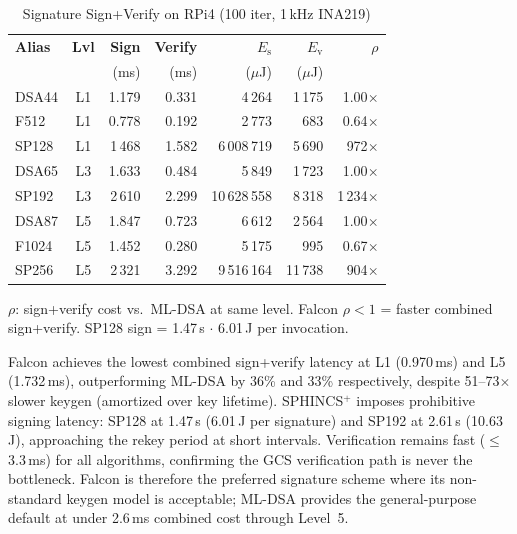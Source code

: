 \begin{table}[t]
\centering
\caption{Signature Sign+Verify on RPi4 (100 iter, 1\,kHz INA219)}
\label{tab:sig}
\footnotesize
\begin{tabular}{@{}lcrrrrr@{}}
\toprule
\textbf{Alias} & \textbf{Lvl} &
  \textbf{Sign} & \textbf{Verify} &
  \textbf{$E_\text{s}$} & \textbf{$E_\text{v}$} &
  \textbf{$\rho$} \\
& & (ms) & (ms) & ($\mu$J) & ($\mu$J) & \\
\midrule
DSA44  & L1 & 1.179 & 0.331  & 4\,264  & 1\,175  & 1.00$\times$ \\
F512   & L1 & 0.778 & 0.192  & 2\,773  & 683     & 0.64$\times$ \\
SP128  & L1 & 1\,468 & 1.582  & 6\,008\,719 & 5\,690 & 972$\times$ \\
\midrule
DSA65  & L3 & 1.633 & 0.484  & 5\,849  & 1\,723  & 1.00$\times$ \\
SP192  & L3 & 2\,610 & 2.299  & 10\,628\,558 & 8\,318 & 1\,234$\times$ \\
\midrule
DSA87  & L5 & 1.847 & 0.723  & 6\,612  & 2\,564  & 1.00$\times$ \\
F1024  & L5 & 1.452 & 0.280  & 5\,175  & 995     & 0.67$\times$ \\
SP256  & L5 & 2\,321 & 3.292  & 9\,516\,164 & 11\,738 & 904$\times$ \\
\bottomrule
\end{tabular}
\begin{tablenotes}
\footnotesize
\item $\rho$: sign+verify cost vs.\ ML-DSA at same level.
  Falcon $\rho < 1$ = faster combined sign+verify.
  SP128 sign = 1.47\,s $\cdot$ 6.01\,J per invocation.
\end{tablenotes}
\end{table}

Falcon achieves the lowest combined sign+verify latency at L1
(0.970\,ms) and L5 (1.732\,ms), outperforming ML-DSA by 36\% and 33\%
respectively, despite 51--73$\times$ slower keygen (amortized over key
lifetime).  SPHINCS$^+$ imposes prohibitive signing latency:
SP128 at 1.47\,s (6.01\,J per signature) and SP192 at 2.61\,s
(10.63\,J), approaching the rekey period at short intervals.
Verification remains fast ($\leq$3.3\,ms) for all algorithms,
confirming the GCS verification path is never the bottleneck.
Falcon is therefore the preferred signature scheme where its
non-standard keygen model is acceptable; ML-DSA provides the
general-purpose default at under 2.6\,ms combined cost through
Level~5.

